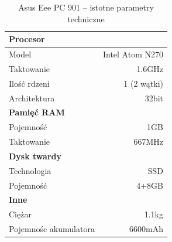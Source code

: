 \begin{table}[h!]
\caption{Asus Eee PC 901 -- istotne parametry techniczne}
\centering
\small
\begin{tabular*}{0.6\textwidth}{@{\extracolsep{\fill}} lr}
\toprule
\textbf{Procesor}\\
\midrule
Model & Intel Atom N270\\
Taktowanie & 1.6GHz\\
Ilość rdzeni & 1 (2 wątki)\\
Architektura & 32bit \\
\midrule
\textbf{Pamięć RAM} \\
\midrule
Pojemność & 1GB \\
Taktowanie & 667MHz \\
\midrule
\textbf{Dysk twardy} \\
\midrule
Technologia & SSD \\
Pojemność & 4+8GB \\
\midrule
\textbf{Inne} \\
\midrule
Ciężar & 1.1kg \\
Pojemnośc akumulatora & 6600mAh \\
\bottomrule
\end{tabular*}
\label{tab:eee_params}
\end{table}


